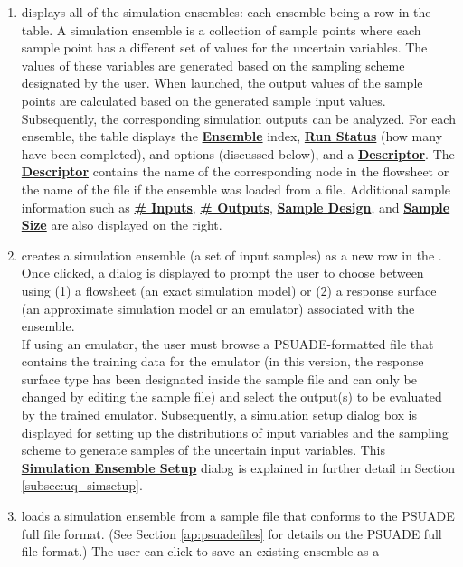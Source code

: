 \begin{enumerate}
\item
	 displays all of the simulation ensembles:
	each ensemble being a row in the table. A simulation ensemble is a
	collection of sample points where each sample point has a different set
	of values for the uncertain variables. The values of these variables are
	generated based on the sampling scheme designated by the user. When
	launched, the output values of the sample points are calculated based on
	the generated sample input values. Subsequently, the corresponding
	simulation outputs can be analyzed. For each ensemble, the table
	displays the \textbf{\underline{Ensemble}} index, \textbf{\underline{Run Status}} (how many have been
	completed),  and  options (discussed below), and a
	\textbf{\underline{Descriptor}}. The \textbf{\underline{Descriptor}} contains the name of the corresponding node
	in the flowsheet or the name of the file if the ensemble was loaded from
	a file. Additional sample information such as \textbf{\underline{\# Inputs}}, \textbf{\underline{\# Outputs}}, \textbf{\underline{Sample Design}}, and \textbf{\underline{Sample Size}} are also displayed on
	the right.
\item 
	 creates a simulation ensemble (a set of input samples)
	as a new row in the . Once clicked, a
	dialog is displayed to prompt the user to choose between using (1) a
	flowsheet (an exact simulation model) or (2) a response surface (an
	approximate simulation model or an emulator) associated with the
	ensemble. \\
	If using an emulator, the user must browse a PSUADE-formatted file that
	contains the training data for the emulator (in this version, the
	response surface type has been designated inside the sample file and can
	only be changed by editing the sample file) and select the output(s) to
	be evaluated by the trained emulator. Subsequently, a simulation setup
	dialog box is displayed for setting up the distributions of input
	variables and the sampling scheme to generate samples of the uncertain
	input variables. This \textbf{\underline{Simulation Ensemble Setup}} dialog is explained in further detail in Section \ref{subsec:uq_simsetup}.
\item
	 loads a simulation ensemble from a sample file
 	that conforms to the PSUADE full file format. (See
 	Section \ref{ap:psuadefiles} for details on the PSUADE full file format.)
   The user can click  to save an existing ensemble as a

\end{enumerate}
